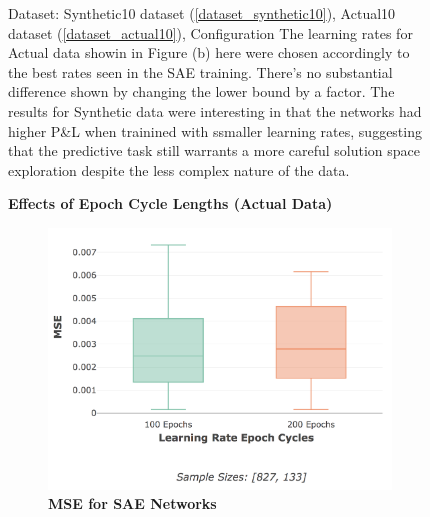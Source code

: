 \documentclass[a4paper,11pt,oneside]{article}
\theoremstyle{plain}
\theoremstyle{definition}
\begin{document}
\begin{figure}[H]
\begin{subfigure}{.5\textwidth}
		\label{figure-actual_pl_minmax_lr}
	\end{subfigure}
	\caption{Dataset: Synthetic10 dataset (\ref{dataset_synthetic10}), Actual10 dataset (\ref{dataset_actual10}), Configuration
		\newline The learning rates for Actual data showin in Figure (b) here were chosen accordingly to the best rates seen in the SAE training. There's no substantial difference shown by changing the lower bound by a factor. The results for Synthetic data were interesting in that the networks had higher P\&L when trainined with ssmaller learning rates, suggesting that the predictive task still warrants a more careful solution space exploration despite the less complex nature of the data.}
	\label{figure-pl_lr}
\end{figure}

\begin{figure}[H]
	\centering
	\textbf{Effects of Epoch Cycle Lengths (Actual Data)}
	\begin{subfigure}{.5\textwidth}
		\centering 
		\includegraphics[scale=0.26]{images/results/network/lr/actual_mse_lr_epochs.png}
		\caption{\textbf{MSE for SAE Networks} 
			\newline }
		\label{figure-actual_mse_lr_epochs}
	\end{subfigure}%
	\begin{subfigure}{.5\textwidth}
		\centering 

\end{subfigure}
\end{figure}
\end{document}
